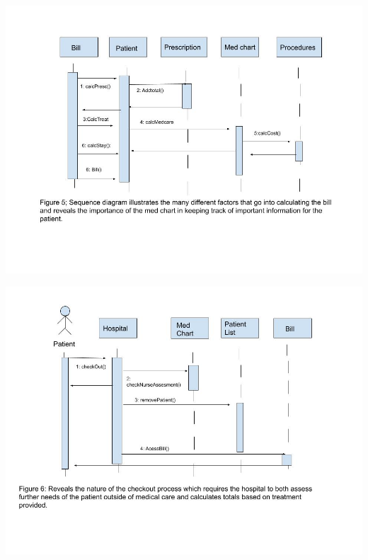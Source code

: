 \documentclass{article}
\begin{document}
\includegraphics{Patient billing sequence 4}

\includegraphics{Patient Checkout sequence 5}
    
\end{document}
